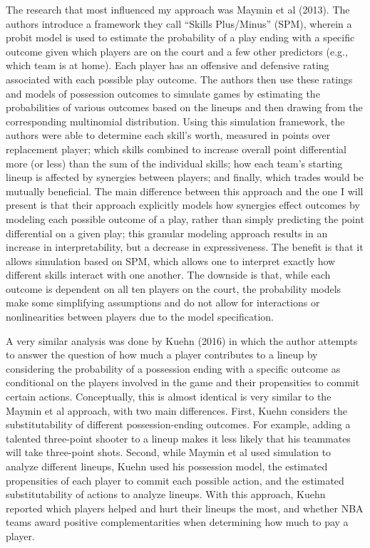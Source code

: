 The research that most influenced my approach was Maymin et al (2013). The authors
introduce a framework they call ``Skills Plus/Minus'' (SPM), wherein a probit model
is used to estimate the probability of a play ending with a specific outcome given
which players are on the court and a few other predictors (e.g., which team is at
home). Each player has an offensive and defensive rating associated with each
possible play outcome. The authors then use these ratings and models of possession
outcomes to simulate games by estimating the probabilities of various outcomes based
on the lineups and then drawing from the corresponding multinomial distribution.
Using this simulation framework, the authors were able to determine each skill's
worth, measured in points over replacement player; which skills combined to increase
overall point differential more (or less) than the sum of the individual skills; how
each team’s starting lineup is affected by synergies between players; and finally,
which trades would be mutually beneficial. The main difference between this approach
and the one I will present is that their approach explicitly models how synergies
effect outcomes by modeling each possible outcome of a play, rather than simply
predicting the point differential on a given play; this granular modeling approach
results in an increase in interpretability, but a decrease in expressiveness. The
benefit is that it allows simulation based on SPM, which allows one to interpret
exactly how different skills interact with one another. The downside is that, while
each outcome is dependent on all ten players on the court, the probability models
make some simplifying assumptions and do not allow for interactions or
nonlinearities between players due to the model specification.

A very similar analysis was done by Kuehn (2016) in which the author attempts to
answer the question of how much a player contributes to a lineup by considering the
probability of a possession ending with a specific outcome as conditional on the
players involved in the game and their propensities to commit certain actions.
Conceptually, this is almost identical is very similar to the Maymin et al approach,
with two main differences. First, Kuehn considers the substitutability of different
possession-ending outcomes. For example, adding a talented three-point shooter to a
lineup makes it less likely that his teammates will take three-point shots. Second,
while Maymin et al used simulation to analyze different lineups, Kuehn used his
possession model, the estimated propensities of each player to commit each possible
action, and the estimated substitutability of actions to analyze lineups. With this
approach, Kuehn reported which players helped and hurt their lineups the most, and
whether NBA teams award positive complementarities when determining how much to pay
a player.

